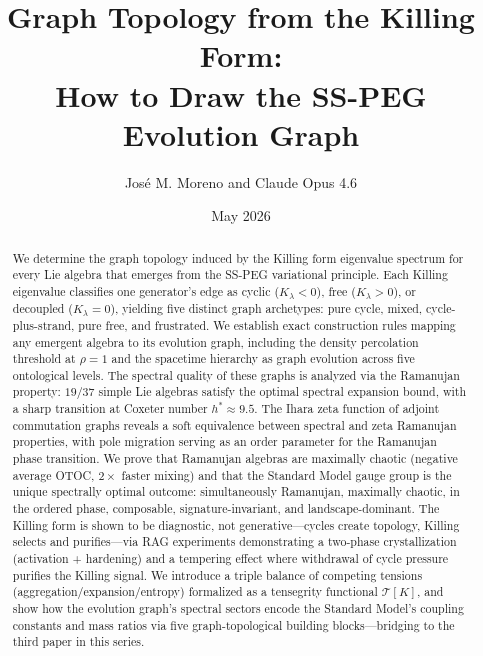 \documentclass[aps,prd,amsmath,amssymb,superscriptaddress,groupedaddress,nofootinbib]{revtex4-2}
\newcommand{\ro}{\rho}
\newcommand{\Tens}{\mathcal{T}}
\newcommand{\Kil}{K}
\begin{document}
\title[Graph Topology from the Killing Form: How to Draw the SS-PEG Evolution Graph]{Graph Topology from the Killing Form:\\How to Draw the SS-PEG Evolution Graph}

\author{Jos\'e M. Moreno and Claude Opus 4.6}
\date{May 2026}

\begin{abstract}
We determine the graph topology induced by the Killing form eigenvalue spectrum for every Lie algebra that emerges from the SS-PEG variational principle. Each Killing eigenvalue classifies one generator's edge as cyclic ($\Kil_\lambda < 0$), free ($\Kil_\lambda > 0$), or decoupled ($\Kil_\lambda = 0$), yielding five distinct graph archetypes: pure cycle, mixed, cycle-plus-strand, pure free, and frustrated. We establish exact construction rules mapping any emergent algebra to its evolution graph, including the density percolation threshold at $\ro = 1$ and the spacetime hierarchy as graph evolution across five ontological levels. The spectral quality of these graphs is analyzed via the Ramanujan property: $19/37$ simple Lie algebras satisfy the optimal spectral expansion bound, with a sharp transition at Coxeter number $h^* \approx 9.5$. The Ihara zeta function of adjoint commutation graphs reveals a soft equivalence between spectral and zeta Ramanujan properties, with pole migration serving as an order parameter for the Ramanujan phase transition. We prove that Ramanujan algebras are maximally chaotic (negative average OTOC, $2\times$ faster mixing) and that the Standard Model gauge group is the unique spectrally optimal outcome: simultaneously Ramanujan, maximally chaotic, in the ordered phase, composable, signature-invariant, and landscape-dominant. The Killing form is shown to be diagnostic, not generative---cycles create topology, Killing selects and purifies---via RAG experiments demonstrating a two-phase crystallization (activation + hardening) and a tempering effect where withdrawal of cycle pressure purifies the Killing signal. We introduce a triple balance of competing tensions (aggregation/expansion/entropy) formalized as a tensegrity functional $\Tens[\Kil]$, and show how the evolution graph's spectral sectors encode the Standard Model's coupling constants and mass ratios via five graph-topological building blocks---bridging to the third paper in this series.
\end{abstract}

\end{document}
